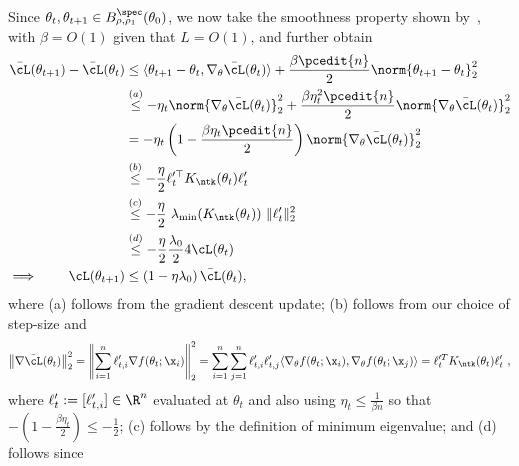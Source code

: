 Since $\theta_t,\theta_{t+1}\in B_{\rho,\rho_1}^{\spec}(\theta_0)$, we now take the smoothness property shown by~\cite[Theorem~5.2]{AB-PCV-LZ-MB:22}, with $\beta=O(1)$ given that $L=O(1)$, and further obtain
\begin{equation}
\begin{aligned}
\bar{\cL}(\theta_{t+1})-\bar{\cL}(\theta_{t})&\leq \langle \theta_{t+1}-\theta_t,\nabla_{\theta}\bar{\cL}(\theta_t)\rangle  +\frac{\beta\pcedit{n}}{2}\norm{\theta_{t+1}-\theta_t}^2_2\\
& \overset{(a)}{\leq} -\eta_t\norm{\nabla_\theta \bar{\cL}(\theta_t)}_2^2 +\frac{\beta\eta_t^2\pcedit{n}}{2}\norm{\nabla_\theta \bar{\cL}(\theta_t)}^2_2\\
&= - \eta_t \left(1 - \frac{\beta\eta_t\pcedit{n}}{2} \right)\norm{\nabla_\theta \bar{\cL}(\theta_t)}^2_2\\
%
&\overset{(b)}{\leq} - \frac{\eta}{2} \ell_t'^\top K_{\ntk}(\theta_t)\ell_t' \\
&\overset{(c)}{\leq} - \frac{\eta}{2} ~\lambda_{\min}(K_{\ntk}(\theta_t))~ \|\ell'_t \|_2^2 \\
&\overset{(d)}{\leq} - \frac{\eta}{2}  \frac{\lambda_0}{2} 4 \cL(\theta_t) \\
\implies \qquad \cL(\theta_{t+1})&\leq \left(1- \eta  \lambda_0 \right) \bar{\cL}(\theta_t),
\end{aligned}
\end{equation}
where (a) follows from the gradient descent update;  
%
(b) follows from our choice of step-size and 
\begin{align*}
\left\| \nabla \bar{\cL}(\theta_t) \right\|_2^2 = \left\| \sum_{i=1}^n \ell'_{t,i} \nabla f(\theta_t;\x_i) \right\|_2^2 =  \sum_{i=1}^n \sum_{j=1}^n \ell'_{t,i} \ell'_{t,j} \langle \nabla_{\theta} f(\theta_t;\x_i), \nabla_{\theta} f(\theta_t;\x_j) \rangle = \ell_t'^T K_{\ntk}(\theta_t) \ell_t'~,
\end{align*}
where $\ell_t' := [\ell'_{t,i}] \in \R^n$ evaluated at $\theta_t$ and also using $\eta_t  \leq \frac{1}{\beta n}$ so that $-(1-\frac{\beta \eta_t}{2}) \leq -\frac{1}{2}$; 
%
(c)  follows by the definition of minimum eigenvalue;
%
and (d) follows since 
